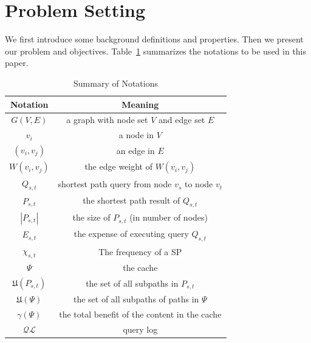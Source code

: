 \documentclass{sig-alternate}
\newcommand{\spath}{SP\xspace}
\begin{document}







\section{Problem Setting}\label{sec:problem}
%
We first introduce some background definitions and properties.
Then we present our problem and objectives.
Table~\ref{tbl:symbols} summarizes the notations to be used in this paper.

\begin{table}[hbt]
\center
\begin{tabular}{|c|c|}
    \hline
    \bf Notation & \bf Meaning \\\hline
    $G(V,E)$ 	& a graph with node set $V$ and edge set $E$ \\\hline
    $v_i$ 		& a node in $V$ \\\hline
    $(v_i,v_j)$  & an edge in $E$ \\\hline
    $W(v_i,v_j)$  & the edge weight of $W(v_i,v_j)$ \\\hline
    $Q_{s,t}$		& shortest path query from node $v_s$ to node $v_t$ \\\hline
    $P_{s,t}$		& the shortest path result of $Q_{s,t}$ \\\hline
    $|P_{s,t}|$		& the size of $P_{s,t}$ (in number of nodes) \\\hline
    $E_{s,t}$		& the expense of executing query $Q_{s,t}$ \\\hline
    $\chi_{s,t}$		& The frequency of a \spath \\\hline
    $\Psi$ 			& the cache \\\hline
    $\mathfrak{U}(P_{s,t})$		& the set of all subpaths in $P_{s,t}$ \\\hline
    $\mathfrak{U}(\Psi)$	& the set of all subpaths of paths in $\Psi$ \\\hline
    $\gamma(\Psi)$	& the total benefit of the content in the cache \\\hline
    $\mathcal{QL}$	& query log  \\\hline
\end{tabular}
\caption{Summary of Notations}
\label{tbl:symbols}
\end{table}
\end{document}
